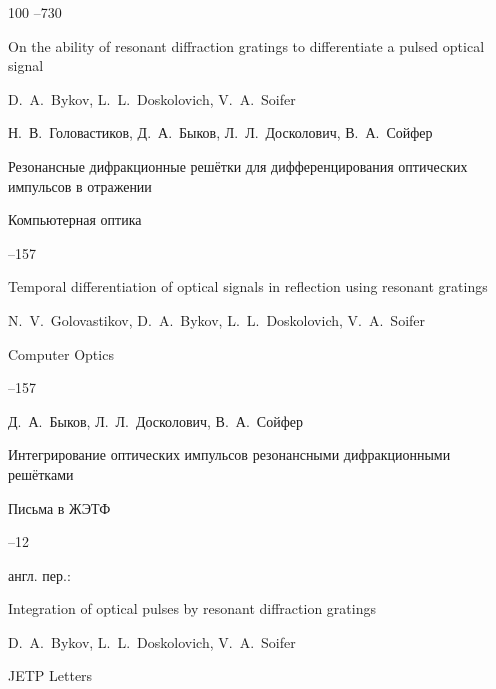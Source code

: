 \begin{thebibliography}{100}
--730

\paper On the ability of resonant diffraction gratings to differentiate a pulsed optical signal

\by  D.~A.~Bykov, L.~L.~Doskolovich, V.~A.~Soifer 






\by Н.~В.~Головастиков, Д.~А.~Быков, Л.~Л.~Досколович, В.~А.~Сойфер

\paper Резонансные дифракционные решётки для дифференцирования оптических импульсов в отражении 

\jour Компьютерная оптика




--157

\misctransl

\paper  Temporal differentiation of optical signals in reflection using resonant gratings

\by N.~V.~Golovastikov, D.~A.~Bykov, L.~L.~Doskolovich,  V.~A.~Soifer


\jour Computer Optics 



--157










\by Д.~А.~Быков, Л.~Л.~Досколович, В.~А.~Сойфер

\paper Интегрирование оптических импульсов резонансными дифракционными решётками

\jour Письма в ЖЭТФ




--12

\transl англ. пер.:~

\paper Integration of optical pulses by resonant diffraction gratings

\by D.~A.~Bykov,  L.~L.~Doskolovich, V.~A.~Soifer


\jour JETP Letters 



\end{thebibliography}
